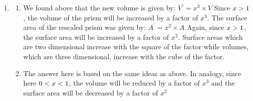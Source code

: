 {\begin{mdframed}[linewidth=4, leftmargin=40, rightmargin=40]
\begin{exercise}
\begin{enumerate}[noitemsep, label=\textbf{Step} \textbf{\arabic*}. ]
{\begin{minipage}{\columnwidth}
    \parbox[t]{\mymathboxwidth}{\large$
    {A}^{\text{'}}=2\ensuremath{\times}\left({L}^{\text{'}}\ensuremath{\times}{b}^{\text{'}}+{L}^{\text{'}}\ensuremath{\times}{h}^{\text{'}}+{b}^{\text{'}}\ensuremath{\times}{h}^{\text{'}}\right)=2\ensuremath{\times}\left(x\ensuremath{\times}L\ensuremath{\times}x\ensuremath{\times}b+x\ensuremath{\times}L\ensuremath{\times}x\ensuremath{\times}h+x\ensuremath{\times}b\ensuremath{\times}x\ensuremath{\times}h\right)={x}^{2}\ensuremath{\times}2\ensuremath{\times}\left(L\ensuremath{\times}b+L\ensuremath{\times}h+b\ensuremath{\times}h\right)={x}^{2}\ensuremath{\times}A$}\hfill
    \parbox[t]{48pt}{\raggedleft 
    (13.23)}
    \end{minipage}\vspace{12pt}\par
    }%
    
        
        \item  
        \label{m39357*id64313}\begin{enumerate}[noitemsep, label=\textbf{\alph*}. ] 
            \leftskip=20pt\rightskip=\leftskip\label{m39357*uid23}\item We found above that the new volume is given by:
${V}^{\text{'}}={x}^{3}\ensuremath{\times}V$
Since $x>{}1$, the volume of the prism will be increased by a factor of \begin{math}{x}^{3}\end{math}.
The surface area of the rescaled prism was given by:
${A}^{\text{'}}={x}^{2}\ensuremath{\times}A$
Again, since $x>{}1$, the surface area will be increased by a factor of \begin{math}{x}^{2}\end{math}. Surface areas which are two dimensional increase with the square of the factor while volumes, which are three dimensional, increase with the cube of the factor.
\label{m39357*uid24}\item The answer here is based on the same ideas as above.
In analogy, since here $0<{}x<{}1$, the volume will be reduced by a factor of \begin{math}{x}^{3}\end{math} and the surface area will be decreased by a factor of \begin{math}{x}^{2}\end{math}\end{enumerate}
        
        
        \end{enumerate}
         

    \end{exercise}
    \end{mdframed}
    }
    \noindent
  
